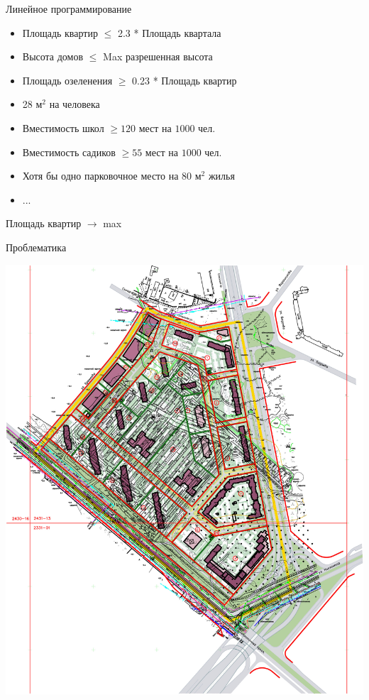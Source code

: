 \documentclass[14pt, fleqn, xcolor={dvipsnames, table}]{beamer}
\begin{document}
        \begin{frame}{Линейное программирование}
            \begin{itemize}
                \item Площадь квартир $\le$ 2.3 * Площадь квартала
                \item Высота домов $\le$ Max разрешенная высота
                \item Площадь озеленения $\ge$ 0.23 * Площадь квартир
                \item 28 м$^2$ на человека
                \item Вместимость школ $\ge 120$ мест на $1000$ чел.
                \item Вместимость садиков $\ge 55$ мест на $1000$ чел.
                \item Хотя бы одно парковочное место на 80 м$^2$ жилья
                \item ...
            \end{itemize}
            Площадь квартир $\longrightarrow$ max            
                          
        \end{frame}
        
        \begin{frame}{Проблематика}
            \begin{center}
                \includegraphics[scale=0.075]{nerd.jpg} 
            \end{center}  
        \end{frame}
        
\end{document}
